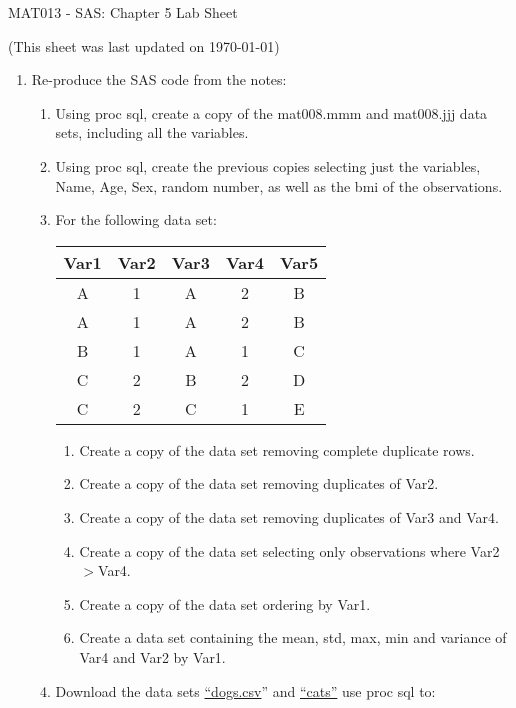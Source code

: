 \documentclass[12pt]{article}
\begin{document}
\begin{center}
\huge{MAT013 - SAS: Chapter 5 Lab Sheet}\\
\begin{center}
\tiny{(This sheet was last updated on \today)}
\end{center}
\end{center}

\begin{enumerate}
\item Re-produce the SAS code from the notes:
\begin{enumerate}
\item Using proc sql, create a copy of the mat008.mmm and mat008.jjj data sets, including all the variables.
\item Using proc sql, create the previous copies selecting just the variables, Name, Age, Sex, random number, as well as the bmi of the observations.
\item For the following data set:
\begin{center}
\begin{tabular}{|c|c|c|c|c|}
\hline
Var1&Var2&Var3&Var4&Var5\\\hline\hline
A&1&A&2&B\\\hline
A&1&A&2&B\\\hline
B&1&A&1&C\\\hline
C&2&B&2&D\\\hline
C&2&C&1&E\\\hline
\end{tabular}
\end{center}
\begin{enumerate}
\item Create a copy of the data set removing complete duplicate rows.
\item Create a copy of the data set removing duplicates of Var2.
\item Create a copy of the data set removing duplicates of Var3 and Var4.
\item Create a copy of the data set selecting only observations where Var2$>$Var4.
\item Create a copy of the data set ordering by Var1.
\item Create a data set containing the mean, std, max, min and variance of Var4 and Var2 by Var1.
\end{enumerate}
\item Download the data sets \href{http://db.tt/uYy2jxrc}{ ``dogs.csv}'' and \href{http://db.tt/8UP3VUwg}{``cats''} use proc sql to:
\begin{enumerate}

\end{enumerate}
\end{enumerate}
\end{enumerate}
\end{document}
